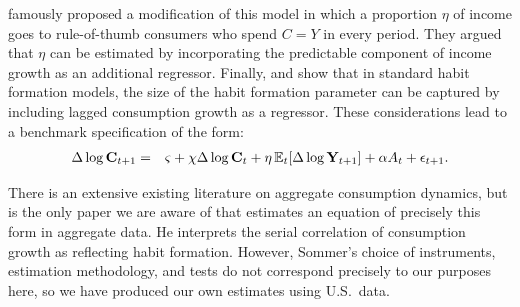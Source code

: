 \documentclass[titlepage]{./econtex}
\begin{document}
\cite{cmModel} famously proposed a modification of this model in which a proportion $\eta$ of income goes to rule-of-thumb consumers who spend $C=Y$ in every period.  They argued that $\eta$ can be estimated by incorporating the predictable component of income growth as an additional regressor.  Finally, \cite{dynanHabits} and \cite{som07} show that in standard habit formation models, the size of the habit formation parameter can be captured by including lagged consumption growth as a regressor.  These considerations lead to a benchmark specification of the form:
\begin{eqnarray}
  \label{eq:CGrowBench}
  \Delta \log \mathbf{C}_{t+1} & = & \varsigma+\chi \Delta \log \mathbf{C}_{t}+\eta \operatorname{\mathbb{E}}_{t}[\Delta \log \mathbf{Y}_{t+1}]+\alpha A_{t}+\epsilon_{t+1}.
\end{eqnarray}

There is an extensive existing literature on aggregate consumption dynamics, but \cite{som07} is the only paper we are aware of that estimates an equation of precisely this form in aggregate data.  He interprets the serial correlation of consumption growth as reflecting habit formation. However, Sommer's choice of instruments, estimation methodology, and tests do not correspond precisely to our purposes here, so we have produced our own estimates using U.S.\ data.

\end{document}
